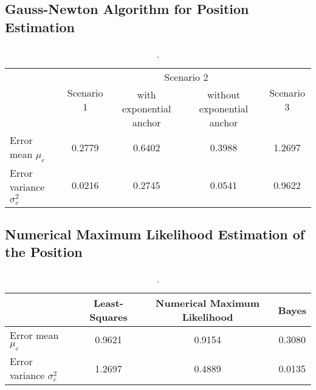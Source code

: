 \documentclass{article}
\begin{document}
\subsection{Gauss-Newton Algorithm for Position Estimation}

\begin{table}[h]
\centering
\begin{tabular}{l||c||c|c||c|}
\cline{2-5}
                                                       & \multirow{2}{*}{Scenario 1} & \multicolumn{2}{c||}{Scenario 2}                      & \multirow{2}{*}{Scenario 3} \\ \cline{3-4}
                                                       &                             & with exponential anchor & without exponential anchor &                             \\ \hline\hline
\multicolumn{1}{|l||}{Error mean $\mu_{e}$}          & 0.2779                      & 0.6402                  & 0.3988                     & 1.2697                      \\ \hline
\multicolumn{1}{|l||}{Error variance $\sigma^2_{e}$} & 0.0216                      & 0.2745                  & 0.0541                     & 0.9622                      \\ \hline
\end{tabular}
\caption{.}
\label{tab:ls_mean_var}
\end{table}

\subsection{Numerical Maximum Likelihood Estimation of the Position}

\begin{table}[h]
\centering
\begin{tabular}{l||c||c||c|}
\cline{2-4}
                                                   & Least-Squares & Numerical Maximum Likelihood & Bayes  \\ \hline \hline
\multicolumn{1}{|l||}{Error mean $\mu_e$}           & 0.9621        & 0.9154                       & 0.3080 \\ \hline
\multicolumn{1}{|l||}{Error variance $\sigma^2_e$} & 1.2697        & 0.4889                       & 0.0135 \\ \hline
\end{tabular}
\caption{.}
\label{tab:scen3_mean_var}
\end{table}
\end{document}
